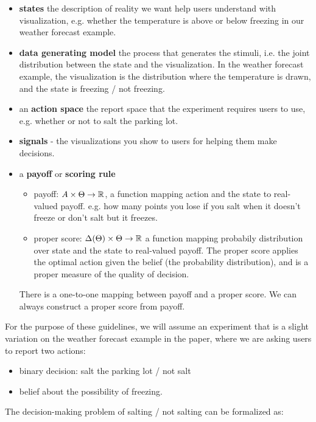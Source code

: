 \documentclass{article}
\begin{document}
\begin{itemize}
    \item \textbf{states} the description of reality we want help users understand with visualization, e.g. whether the temperature is above or below freezing in our weather forecast example.
    \item \textbf{data generating model} the process that generates the stimuli, i.e. the joint distribution between the state and the visualization. In the weather forecast example, the visualization is the distribution where the temperature is drawn, and the state is freezing / not freezing.
    \item an \textbf{action space}  the report space that the experiment requires users to use, e.g. whether or not to salt the parking lot.
    \item \textbf{signals}  - the visualizations you show to users for helping them make decisions.
    \item a \textbf{payoff} or \textbf{scoring rule} 
    \begin{itemize}
    \item payoff: $A\times\Theta\to \mathbb{R}$, a function mapping action and the state to real-valued payoff. e.g. how many points you lose if you salt when it doesn't freeze or don't salt but it freezes.
    \item proper score: $\Delta(\Theta)\times\Theta\to \mathbb{R}$ a function mapping probabily distribution over state and the state to real-valued payoff. The proper score applies the optimal action given the belief (the probability distribution), and is a proper measure of the quality of decision.
    \end{itemize}
    
    There is a one-to-one mapping between payoff and a proper score. We can always construct a proper score from payoff. 
\end{itemize}

For the purpose of these guidelines, we will assume an experiment that is a slight variation on the weather forecast example in the paper, where we are asking users to report two actions: 
\begin{itemize}
\item binary decision: salt the parking lot / not salt
\item belief about the possibility of freezing.
\end{itemize}
The decision-making problem of salting / not salting can be formalized as:
\end{document}
